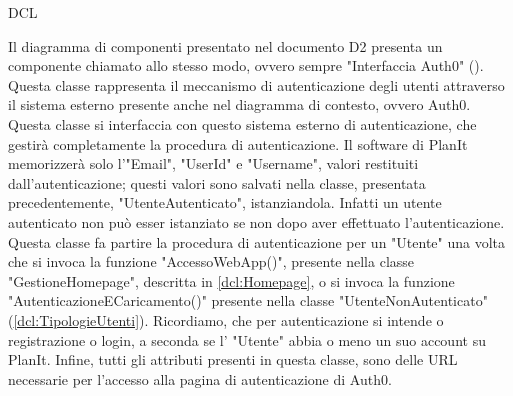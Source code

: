 \begin{listaPersonale}{DCL}
    \begin{center}
        
    \end{center}
    \newpage


    Il diagramma di componenti presentato nel documento D2 presenta un componente chiamato allo stesso modo, ovvero sempre "Interfaccia Auth0" (). Questa classe rappresenta il meccanismo di autenticazione degli utenti attraverso il sistema esterno presente anche nel diagramma di contesto, ovvero Auth0. Questa classe si interfaccia con questo sistema esterno di autenticazione, che gestirà completamente la procedura di autenticazione. Il software di PlanIt memorizzerà solo l'"Email", "UserId" e "Username", valori restituiti dall'autenticazione; questi valori sono salvati nella classe, presentata precedentemente, "UtenteAutenticato", istanziandola. Infatti un utente autenticato non può esser istanziato se non dopo aver effettuato l'autenticazione. \\
    Questa classe fa partire la procedura di autenticazione per un "Utente" una volta che si invoca la funzione "AccessoWebApp()", presente nella classe "GestioneHomepage", descritta in \ref{dcl:Homepage}, o si invoca la funzione "AutenticazioneECaricamento()" presente nella classe "UtenteNonAutenticato" (\ref{dcl:TipologieUtenti}). Ricordiamo, che per autenticazione si intende o registrazione o login, a seconda se l' "Utente" abbia o meno un suo account su PlanIt. Infine, tutti gli attributi presenti in questa classe, sono delle URL necessarie per l'accesso alla pagina di autenticazione di Auth0.


    \begin{center}
        
    \end{center}
    \newpage




\end{listaPersonale}
